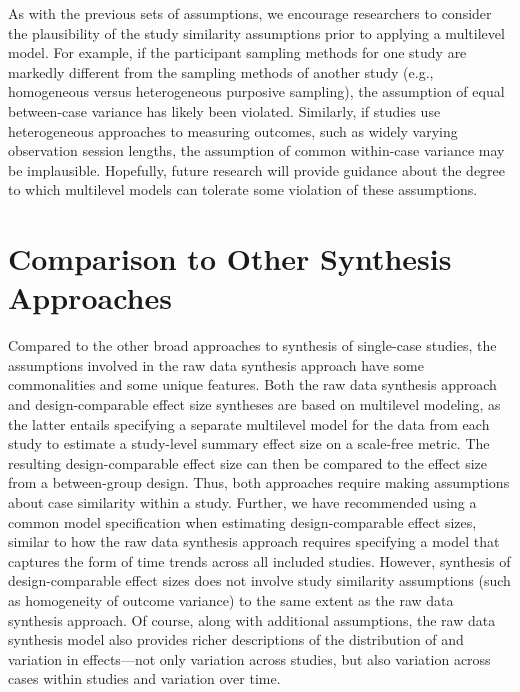 \documentclass[
]{book}
\begin{document}
As with the previous sets of assumptions, we encourage researchers to consider the plausibility of the study similarity assumptions prior to applying a multilevel model.
For example, if the participant sampling methods for one study are markedly different from the sampling methods of another study (e.g., homogeneous versus heterogeneous purposive sampling), the assumption of equal between-case variance has likely been violated.
Similarly, if studies use heterogeneous approaches to measuring outcomes, such as widely varying observation session lengths, the assumption of common within-case variance may be implausible.
Hopefully, future research will provide guidance about the degree to which multilevel models can tolerate some violation of these assumptions.

\hypertarget{comparison-to-other-synthesis-approaches}{%
\section{Comparison to Other Synthesis Approaches}\label{comparison-to-other-synthesis-approaches}}

Compared to the other broad approaches to synthesis of single-case studies, the assumptions involved in the raw data synthesis approach have some commonalities and some unique features.
Both the raw data synthesis approach and design-comparable effect size syntheses are based on multilevel modeling, as the latter entails specifying a separate multilevel model for the data from each study to estimate a study-level summary effect size on a scale-free metric.
The resulting design-comparable effect size can then be compared to the effect size from a between-group design.
Thus, both approaches require making assumptions about case similarity within a study.
Further, we have recommended using a common model specification when estimating design-comparable effect sizes, similar to how the raw data synthesis approach requires specifying a model that captures the form of time trends across all included studies.
However, synthesis of design-comparable effect sizes does not involve study similarity assumptions (such as homogeneity of outcome variance) to the same extent as the raw data synthesis approach.
Of course, along with additional assumptions, the raw data synthesis model also provides richer descriptions of the distribution of and variation in effects---not only variation across studies, but also variation across cases within studies and variation over time.
\end{document}
